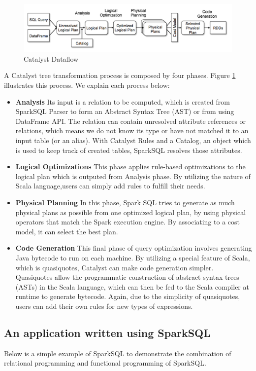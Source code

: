 \begin{figure}
\includegraphics[width=\textwidth]{Figures/catalyst-flow.png}
\caption{Catalyst Dataflow}
\label{fig:catalyst1}
\end{figure}

A Catalyst tree transformation process is composed by four phases. Figure \ref{fig:catalyst1} illustrates this process. We explain each process below:
\begin{itemize}
\item \textbf{Analysis} Its input is a relation to be computed, which is created from SparkSQL Parser to form an Abstract Syntax Tree (AST) or from using DataFrame API. The relation can contain unresolved attribute references or relations, which means we do not know its type or have not matched it to an input table (or an alias). With Catalyst Rules and a Catalog, an object which is used to keep track of created tables, SparkSQL resolves those attributes.
\item \textbf{Logical Optimizations} This phase applies rule-based optimizations to the logical plan which is outputed from Analysis phase. By utilizing the nature of Scala language,users can simply add rules to fulfill their needs.
\item \textbf{Physical Planning} In this phase, Spark SQL tries to generate as much physical plans as possible from one optimized logical plan, by using physical operators that match the Spark execution engine. By associating to a cost model, it can select the best plan.
\item \textbf{Code Generation} This final phase of query optimization involves generating Java bytecode to run on each machine. By utilizing a special feature of Scala, which is quasiquotes, Catalyst can make code generation simpler. Quasiquotes allow the programmatic construction of abstract syntax trees (ASTs) in the Scala language, which can then be fed to the Scala compiler at runtime to generate bytecode. Again, due to the simplicity of quasiquotes, users can add their own rules for new types of expressions.
\end{itemize}
\subsection{An application written using SparkSQL}
Below is a simple example of SparkSQL to demonstrate the combination of relational programming and functional programming of SparkSQL.\\

